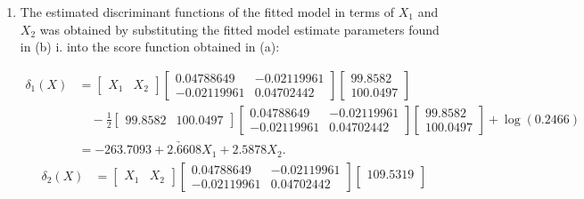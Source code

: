 \begin{enumerate}[label=\roman*.]
    \item The estimated discriminant functions of the fitted model in terms of $X_1$ and $X_2$ was obtained
          by substituting the fitted model estimate parameters found in (b) i. into the score function obtained
          in (a):

          \begin{align*}
            \delta_1(X)
            &=
            \begin{bmatrix}
            X_1 & X_2
            \end{bmatrix}
            \begin{bmatrix}
            0.04788649 & -0.02119961 \\
            -0.02119961 & 0.04702442
            \end{bmatrix}
            \begin{bmatrix}
            99.8582 \\
            100.0497
            \end{bmatrix}
            \\[1em]
            &\quad
            -\frac{1}{2}
            \begin{bmatrix}
            99.8582 & 100.0497
            \end{bmatrix}
            \begin{bmatrix}
            0.04788649 & -0.02119961 \\
            -0.02119961 & 0.04702442
            \end{bmatrix}
            \begin{bmatrix}
            99.8582 \\
            100.0497
            \end{bmatrix}
            +\log(0.2466)
            \\[1em]
            &\underrightarrow{=-263.7093 + 2.6608X_1 + 2.5878X_2}.
          \end{align*}
          \begin{align*}
            \delta_2(X)
            &=
            \begin{bmatrix}
            X_1 & X_2
            \end{bmatrix}
            \begin{bmatrix}
            0.04788649 & -0.02119961 \\
            -0.02119961 & 0.04702442
            \end{bmatrix}
            \begin{bmatrix}
            109.5319 \\

\end{bmatrix}
\end{align*}
\end{enumerate}
